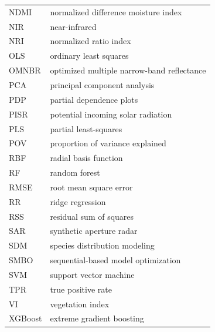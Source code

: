 \documentclass[remotesensing,article,accept,moreauthors,pdftex]{Definitions/mdpi}
\begin{document}
\begin{paracol}{2}
{\begin{tabular}{@{}ll}
		NDMI    & normalized difference moisture index                    \\
		NIR     & near-infrared                                           \\
		NRI     & normalized ratio index                                  \\
		OLS     & ordinary least squares                                  \\
		OMNBR   & optimized multiple narrow-band reflectance              \\
		PCA     & principal component analysis                            \\
		PDP     & partial dependence plots                                \\
		PISR    & potential incoming solar radiation                      \\
		PLS     & partial least-squares                                   \\
		POV     & proportion of variance explained                        \\
		RBF     & radial basis function                                   \\
		RF      & random forest                                           \\
		RMSE    & root mean square error                                  \\
		RR      & ridge regression                                        \\
		RSS     & residual sum of squares                                 \\
		SAR     & synthetic aperture radar                                \\
		SDM     & species distribution modeling                           \\
		SMBO    & sequential-based model optimization                     \\
		SVM     & support vector machine                                  \\
		TPR     & true positive rate                                      \\
		VI      & vegetation index                                        \\
		XGBoost & extreme gradient boosting
	\end{tabular}}


\end{paracol}
\end{document}
